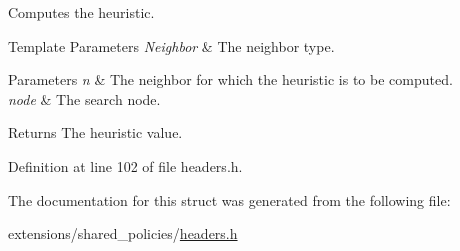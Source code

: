 Computes the heuristic. 


\begin{DoxyTemplParams}{Template Parameters}
{\em Neighbor} & The neighbor type. \\
\hline
\end{DoxyTemplParams}

\begin{DoxyParams}{Parameters}
{\em n} & The neighbor for which the heuristic is to be computed. \\
\hline
{\em node} & The search node. \\
\hline
\end{DoxyParams}
\begin{DoxyReturn}{Returns}
The heuristic value. 
\end{DoxyReturn}


Definition at line 102 of file headers.\+h.



The documentation for this struct was generated from the following file\+:\begin{DoxyCompactItemize}
\item 
extensions/shared\+\_\+policies/\hyperlink{extensions_2shared__policies_2headers_8h}{headers.\+h}\end{DoxyCompactItemize}
